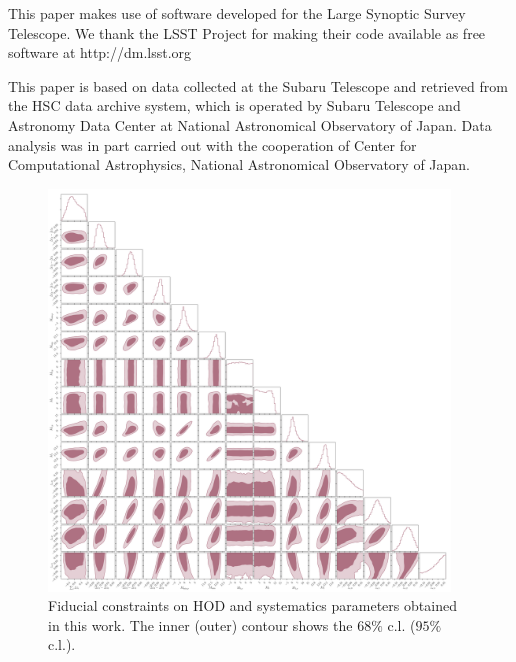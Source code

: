 \documentclass[a4paper,11pt]{article}
\begin{document}
This paper makes use of software developed for the Large Synoptic Survey Telescope. We thank the LSST Project for making their code available as free software at  http://dm.lsst.org

This paper is based on data collected at the Subaru Telescope and retrieved from the HSC data archive system, which is operated by Subaru Telescope and Astronomy Data Center at National Astronomical Observatory of Japan. Data analysis was in part carried out with the cooperation of Center for Computational Astrophysics, National Astronomical Observatory of Japan.

\appendix

\begin{figure}
  \begin{center}
    \includegraphics[width=0.95\textwidth]{figures/contours_mPk=HOD_fix=alpha-fc-sigmaM_HOD=zevol_fit=pz-shifts+prior=0p2-pz-widths+prior=0p2_fit=auto+cross_cosmo=const_cov=G+NG+SSC-LINBIAS_HOD-param=zfid_clfit=HOD-zevol.pdf}
    \caption{Fiducial constraints on HOD and systematics parameters obtained in this work. The inner (outer) contour shows the $68 \%$ c.l. ($95 \%$ c.l.).}
    \label{fig:constraints-fid-full}
  \end{center}
\end{figure}
\end{document}
